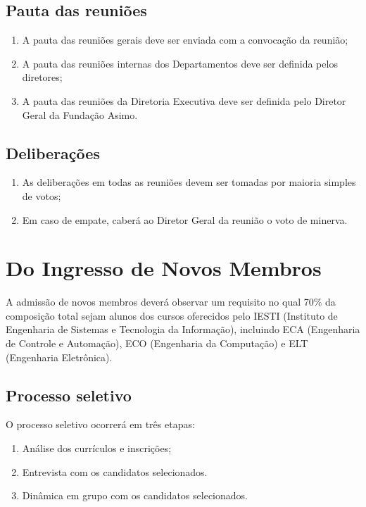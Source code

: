     \section{Pauta das reuniões}
    \begin{enumerate}
        \item A pauta das reuniões gerais deve ser enviada com a convocação da reunião;
        \item A pauta das reuniões internas dos Departamentos deve ser definida pelos diretores;
        \item A pauta das reuniões da Diretoria Executiva deve ser definida pelo Diretor Geral da Fundação Asimo.
    \end{enumerate}
    
    \section{Deliberações}
    \begin{enumerate}
        \item As deliberações em todas as reuniões devem ser tomadas por maioria simples de votos;
        \item Em caso de empate, caberá ao Diretor Geral da reunião o voto de minerva.
    \end{enumerate}
 
\chapter{Do Ingresso de Novos Membros}
   A admissão de novos membros deverá observar um requisito no qual 70$\%$ da composição total sejam alunos dos cursos oferecidos pelo IESTI (Instituto de Engenharia de Sistemas e Tecnologia da Informação), incluindo ECA (Engenharia de Controle e Automação), ECO (Engenharia da Computação) e ELT (Engenharia Eletrônica).
    \section{Processo seletivo}
    O processo seletivo ocorrerá em três etapas:
    \begin{enumerate}
        \item Análise dos currículos e inscrições;
        \item Entrevista com os candidatos selecionados.
        \item Dinâmica em grupo com os candidatos selecionados.
    \end{enumerate}
    
